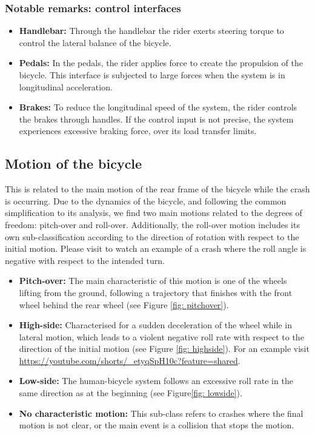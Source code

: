 \documentclass{article}
\begin{document}
\subsubsection{Notable remarks: control interfaces}

\begin{itemize}
    \item \textbf{Handlebar:} Through the handlebar the rider exerts steering torque to control the lateral balance of the bicycle.
    \item \textbf{Pedals:} In the pedals, the rider applies force to create the propulsion of the bicycle.
        This interface is subjected to large forces when the system is in longitudinal acceleration.
    \item \textbf{Brakes:} To reduce the longitudinal speed of the system, the rider controls the brakes through handles.
        If the control input is not precise, the system experiences excessive braking force, over its load transfer limits.
\end{itemize}


\subsection{Motion of the bicycle}

This is related to the main motion of the rear frame of the bicycle while the crash is occurring.
%
Due to the dynamics of the bicycle, and following the common simplification to its analysis, we find two main motions related to the degrees of freedom: pitch-over and roll-over.
%
Additionally, the roll-over motion includes its own sub-classification according to the direction of rotation with respect to the initial motion.
% 
Please visit  to watch an example of a crash where the roll angle is negative with respect to the intended turn.


\begin{itemize}
    \item \textbf{Pitch-over:} The main characteristic of this motion is one of the wheels lifting from the ground, following a trajectory that finishes with the front wheel behind the rear wheel (see Figure \ref{fig: pitchover}).
    \item \textbf{High-side:} Characterised for a sudden deceleration of the wheel while in lateral motion, which leads to a violent negative roll rate with respect to the direction of the initial motion (see Figure \ref{fig: highside}).
        For an example visit \url{https://youtube.com/shorts/_etyqSpH10c?feature=shared}.
    \item \textbf{Low-side:} The human-bicycle system follows an excessive roll rate in the same direction as at the beginning (see Figure\ref{fig: lowside}).
    \item \textbf{No characteristic motion:} This sub-class refers to crashes where the final motion is not clear, or the main event is a collision that stops the motion.
\end{itemize}
\end{document}

